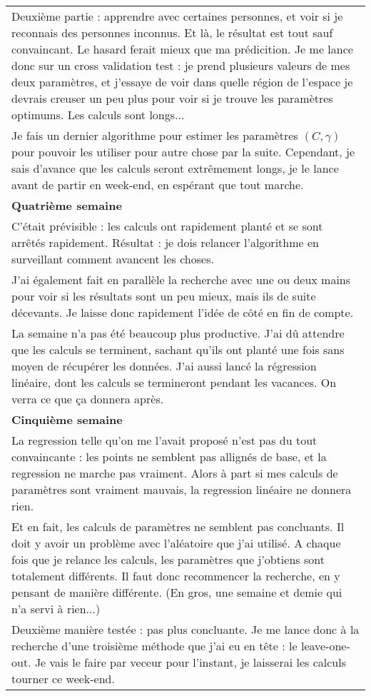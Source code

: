 \begin{longtable}{|p{\textwidth}|}
Deuxième partie : apprendre avec certaines personnes, et voir si je reconnais des personnes inconnus. Et là, le résultat est tout sauf convaincant. Le hasard ferait mieux que ma prédicition. Je me lance donc sur un cross validation test : je prend plusieurs valeurs de mes deux paramètres, et j'essaye de voir dans quelle région de l'espace je devrais creuser un peu plus pour voir si je trouve les paramètres optimums. Les calculs sont longs...\\
Je fais un dernier algorithme pour estimer les paramètres $(C,\gamma)$ pour pouvoir les utiliser pour autre chose par la suite. Cependant, je sais d'avance que les calculs seront extrêmement longs, je le lance avant de partir en week-end, en espérant que tout marche.\\
\hline
\textbf{Quatrième semaine}\\
\hline
C'était prévisible : les calculs ont rapidement planté et se sont arrêtés rapidement. Résultat : je dois relancer l'algorithme en surveillant comment avancent les choses. \\
J'ai également fait en parallèle la recherche avec une ou deux mains pour voir si les résultats sont un peu mieux, mais ils de suite décevants. Je laisse donc rapidement l'idée de côté en fin de compte.\\
La semaine n'a pas été beaucoup plus productive. J'ai dû attendre que les calculs se terminent, sachant qu'ils ont planté une fois sans moyen de récupérer les données. J'ai aussi lancé la régression linéaire, dont les calculs se termineront pendant les vacances. On verra ce que ça donnera après.\\
\hline
\textbf{Cinquième semaine}\\
\hline
La regression telle qu'on me l'avait proposé n'est pas du tout convaincante : les points ne semblent pas allignés de base, et la regression ne marche pas vraiment. Alors à part si mes calculs de paramètres sont vraiment mauvais, la regression linéaire ne donnera rien.\\
Et en fait, les calculs de paramètres ne semblent pas concluants. Il doit y avoir un problème avec l'aléatoire que j'ai utilisé. A chaque fois que je relance les calculs, les paramètres que j'obtiens sont totalement différents. Il faut donc recommencer la recherche, en y pensant de manière différente. (En gros, une semaine et demie qui n'a servi à rien...)\\
Deuxième manière testée : pas plus concluante. Je me lance donc à la recherche d'une troisième méthode que j'ai eu en tête : le leave-one-out. Je vais le faire par veceur pour l'instant, je laisserai les calculs tourner ce week-end.\\

\end{longtable}
